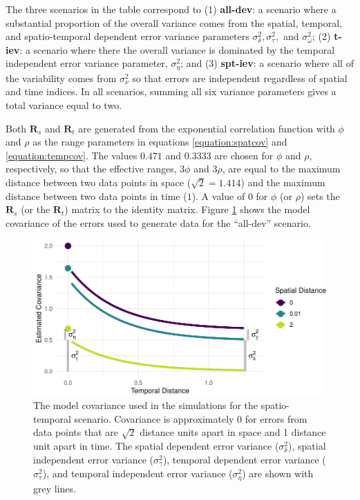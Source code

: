 \documentclass[]{article}    %
\begin{document}
The three scenarios in the table correspond to (1) \textbf{all-dev}: a
scenario where a substantial proportion of the overall variance comes
from the spatial, temporal, and spatio-temporal dependent error variance
parameters \(\sigma^2_{\delta}, \sigma^2_{\tau},\) and
\(\sigma^2_{\omega}\); (2) \textbf{t-iev}: a scenario where there the
overall variance is dominated by the temporal independent error variance
parameter, \(\sigma^2_{\eta}\); and (3) \textbf{spt-iev}: a scenario
where all of the variability comes from \(\sigma^2_{\nu}\) so that
errors are independent regardless of spatial and time indices. In all
scenarios, summing all six variance parameters gives a total variance
equal to two.

Both \(\mathbf{R}_{s}\) and \(\mathbf{R}_t\) are generated from the
exponential correlation function with \(\phi\) and \(\rho\) as the range
parameters in equations \ref{equation:spatcov} and
\ref{equation:tempcov}. The values \(0.471\) and \(0.3333\) are chosen
for \(\phi\) and \(\rho\), respectively, so that the effective ranges,
\(3 \phi\) and \(3 \rho\), are equal to the maximum distance between two
data points in space (\(\sqrt2 = 1.414\)) and the maximum distance
between two data points in time (\(1\)). A value of 0 for \(\phi\) (or
\(\rho\)) sets the \(\mathbf{R}_{s}\) (or the \(\mathbf{R}_t\)) matrix
to the identity matrix. Figure \ref{fig:simcovplot} shows the model
covariance of the errors used to generate data for the ``all-dev''
scenario.

\begin{figure}
\centering
\includegraphics{model_cov.pdf}
\caption{\label{fig:simcovplot} The model covariance used in the
simulations for the spatio-temporal scenario. Covariance is
approximately 0 for errors from data points that are \(\sqrt2\) distance
units apart in space and 1 distance unit apart in time. The spatial
dependent error variance (\(\sigma^2_{\delta}\)), spatial independent
error variance (\(\sigma^2_{\gamma}\)), temporal dependent error
variance (\(\sigma^2_{\tau}\)), and temporal independent error variance
(\(\sigma^2_{\eta}\)) are shown with grey lines.}
\end{figure}
\end{document}
